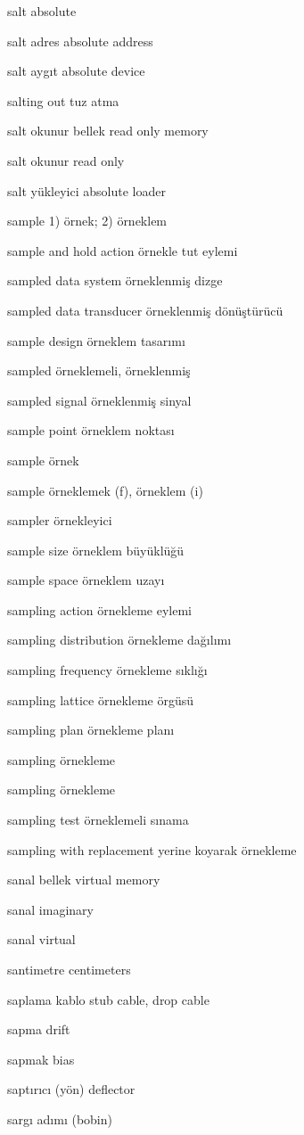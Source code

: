 \documentclass[12pt,fleqn]{article}\usepackage{../../common}
\begin{document}
salt absolute

salt adres absolute address

salt aygıt absolute device

salting out tuz atma

salt okunur bellek read only memory

salt okunur read only

salt yükleyici absolute loader

sample 1) örnek; 2) örneklem

sample and hold action örnekle tut eylemi

sampled data system örneklenmiş dizge

sampled data transducer örneklenmiş dönüştürücü

sample design örneklem tasarımı

sampled örneklemeli, örneklenmiş

sampled signal örneklenmiş sinyal

sample point örneklem noktası

sample örnek

sample örneklemek (f), örneklem (i)

sampler örnekleyici

sample size örneklem büyüklüğü

sample space örneklem uzayı

sampling action örnekleme eylemi

sampling distribution örnekleme dağılımı

sampling frequency örnekleme sıklığı

sampling lattice örnekleme örgüsü

sampling plan örnekleme planı

sampling örnekleme

sampling örnekleme

sampling test örneklemeli sınama

sampling with replacement yerine koyarak örnekleme

sanal bellek virtual memory

sanal imaginary

sanal virtual

santimetre centimeters

saplama kablo stub cable, drop cable

sapma drift

sapmak bias

saptırıcı (yön) deflector

sargı adımı (bobin)
\end{document}
